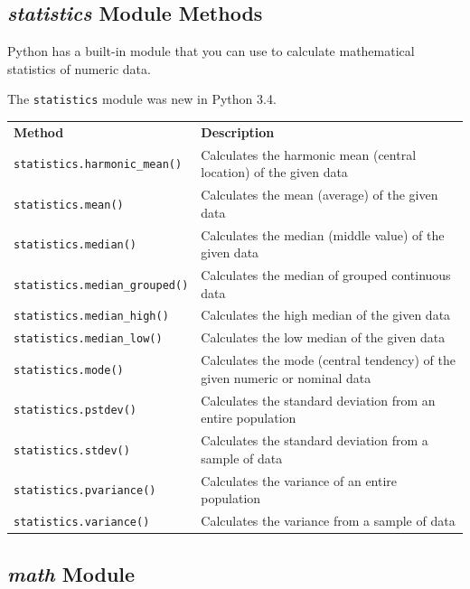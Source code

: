 \documentclass[12pt,a4paper]{article}
\newcommand{\code}[1]{%
	\colorbox{backcolour}{\lstinline{#1}}%
}
\newcommand{\lcode}[1]{%
	\lstinline{#1}%
}
\newcommand{\tcol}[2]{%
	\quad #1 & #2 \\
}
\begin{document}
\subsection{\textit{statistics} Module Methods}\label{pyStatisticsModuleMethod}

Python has a built-in module that you can use to calculate mathematical
statistics of numeric data.

The \code{statistics} module was new in Python 3.4.

\begin{center}
	\begin{longtable}{p{} p{}}
\tcol{\textbf{Method}}{\textbf{Description}}
\tcol{\lcode{statistics.harmonic_mean()}}{Calculates the harmonic mean (central location) of the given data}
\tcol{\lcode{statistics.mean()}}{Calculates the mean (average) of the given data}
\tcol{\lcode{statistics.median()}}{Calculates the median (middle value) of the given data}
\tcol{\lcode{statistics.median_grouped()}}{Calculates the median of grouped continuous data}
\tcol{\lcode{statistics.median_high()}}{Calculates the high median of the given data}
\tcol{\lcode{statistics.median_low()}}{Calculates the low median of the given data}
\tcol{\lcode{statistics.mode()}}{Calculates the mode (central tendency) of the given numeric or nominal data}
\tcol{\lcode{statistics.pstdev()}}{Calculates the standard deviation from an entire population}
\tcol{\lcode{statistics.stdev()}}{Calculates the standard deviation from a sample of data}
\tcol{\lcode{statistics.pvariance()}}{Calculates the variance of an entire population}
\tcol{\lcode{statistics.variance()}}{Calculates the variance from a sample of data}
	\end{longtable}
\end{center}
\subsection{\textit{math} Module}\label{pyMathModuleMethod}
\end{document}
